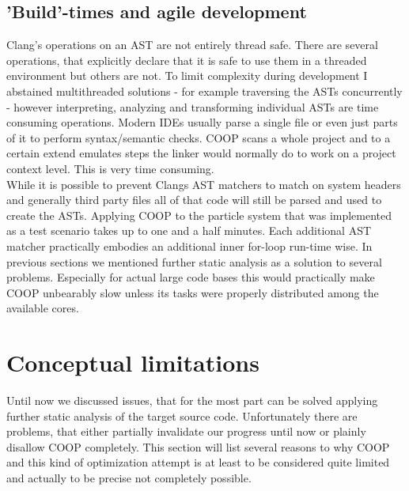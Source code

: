 \subsection{'Build'-times and agile development}\label{build_times}
Clang's operations on an AST are not entirely thread safe. There are several operations, that explicitly declare that it is safe to use them in a threaded environment but others are not. To limit complexity during development I abstained multithreaded solutions - for example traversing the ASTs concurrently - however interpreting, analyzing and transforming individual ASTs are time consuming operations. Modern IDEs usually parse a single file or even just parts of it to perform syntax/semantic checks. COOP scans a whole project and to a certain extend emulates steps the linker would normally do to work on a project context level. This is very time consuming.\\
While it is possible to prevent Clangs AST matchers to match on system headers and generally third party files all of that code will still be parsed and used to create the ASTs. Applying COOP to the particle system that was implemented as a test scenario takes up to one and a half minutes. Each additional AST matcher practically embodies an additional inner for-loop run-time wise. In previous sections we mentioned further static analysis as a solution to several problems. Especially for actual large code bases this would practically make COOP unbearably slow unless its tasks were properly distributed among the available cores.

\section{Conceptual limitations}
Until now we discussed issues, that for the most part can be solved applying further static analysis of the target source code. Unfortunately there are problems, that either partially invalidate our progress until now or plainly disallow COOP completely. This section will list several reasons to why COOP and this kind of optimization attempt is at least to be considered quite limited and actually to be precise not completely possible.
